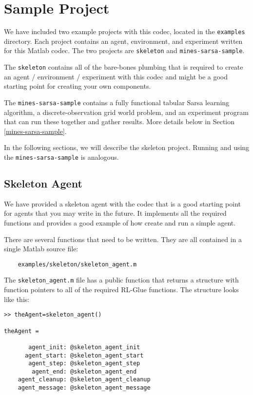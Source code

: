 \documentclass[11pt]{article}
\begin{document}
\section{Sample Project}
We have included two example projects with this codec, located in the \texttt{examples} directory.  Each project contains an agent, environment, and experiment written for this Matlab codec.  The two projects are \texttt{skeleton} and \texttt{mines-sarsa-sample}.

The \texttt{skeleton} contains all of the bare-bones plumbing that is required to create an agent / environment / experiment with this codec and might be a good starting point for creating your own components.

The \texttt{mines-sarsa-sample} contains a fully functional tabular Sarsa learning algorithm, a discrete-observation grid world problem, and an experiment program that can run these together and gather results.  More details below in Section \ref{mines-sarsa-sample}.

In the following sections, we will describe the skeleton project.  Running and using the \texttt{mines-sarsa-sample} is analogous.

\subsection{Skeleton Agent}
\label{sec:agent}
We have provided a skeleton agent with the codec that is a good starting point for agents that you may write in the future.
It implements all the required functions and provides a good example of how create and run a simple agent.

There are several functions that need to be written. They are all contained in a single Matlab source file:
\begin{verbatim}
	examples/skeleton/skeleton_agent.m
\end{verbatim}

The \texttt{skeleton\_agent.m} file has a public function that returns a structure with function pointers to all of the required RL-Glue functions.  The structure looks like this:

\begin{verbatim}
>> theAgent=skeleton_agent()

theAgent = 

       agent_init: @skeleton_agent_init
      agent_start: @skeleton_agent_start
       agent_step: @skeleton_agent_step
        agent_end: @skeleton_agent_end
    agent_cleanup: @skeleton_agent_cleanup
    agent_message: @skeleton_agent_message
\end{verbatim}
\end{document}
